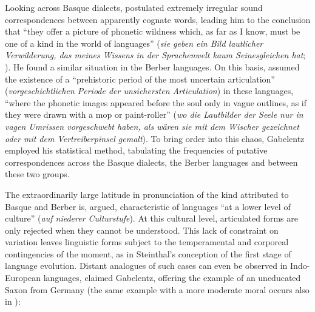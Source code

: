 \documentclass[output=paper]{langscibook}
\begin{document}
Looking across Basque dialects, \citet{Gabelentz1893} postulated extremely irregular sound correspondences between apparently cognate words, leading him to the conclusion that ``they offer a picture of phonetic wildness which, as far as I know, must be one of a kind in the world of languages'' (\emph{sie geben ein Bild lautlicher Verwilderung, das meines Wissens in der Sprachenwelt kaum Seinesgleichen hat}; \citealt[596]{Gabelentz1893}). He found a similar situation in the Berber languages. On this basis, \citet[604]{Gabelentz1893} assumed the existence of a ``prehistoric period of the most uncertain articulation'' (\emph{vorgeschichtlichen Periode der unsichersten Articulation}) in these languages, ``where the phonetic images appeared before the soul only in vague outlines, as if they were drawn with a mop or paint-roller'' (\emph{wo die Lautbilder der Seele nur in vagen Umrissen vorgeschwebt haben, als wären sie mit dem Wischer gezeichnet oder mit dem Vertreiberpinsel gemalt}). To bring order into this chaos, Gabelentz employed his statistical method, tabulating the frequencies of putative correspondences across the Basque dialects, the Berber languages and between these two groups.

The extraordinarily large latitude in pronunciation of the kind attributed to Basque and Berber is, \citet[606]{Gabelentz1893} argued, characteristic of languages ``at a lower level of culture'' (\emph{auf niederer Culturstufe}). At this cultural level, articulated forms are only rejected when they cannot be understood. This lack of constraint on variation leaves linguistic forms subject to the temperamental and corporeal contingencies of the moment, as in Steinthal's conception of the first stage of language evolution. Distant analogues of such cases can even be observed in Indo-European languages, claimed Gabelentz, offering the example of an uneducated Saxon from Germany (the same example with a more moderate moral occurs also in \citealt[398]{Gabelentz20161891}):
\end{document}

